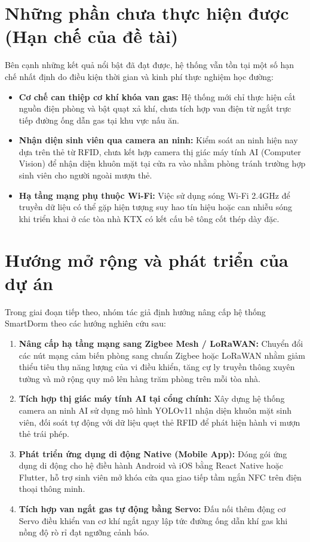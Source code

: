 \section{Những phần chưa thực hiện được (Hạn chế của đề tài)}
\label{sec:han_che}

Bên cạnh những kết quả nổi bật đã đạt được, hệ thống vẫn tồn tại một số hạn chế nhất định do điều kiện thời gian và kinh phí thực nghiệm học đường:
\begin{itemize}
    \item \textbf{Cơ chế can thiệp cơ khí khóa van gas:} Hệ thống mới chỉ thực hiện cắt nguồn điện phòng và bật quạt xả khí, chưa tích hợp van điện từ ngắt trực tiếp đường ống dẫn gas tại khu vực nấu ăn.
    \item \textbf{Nhận diện sinh viên qua camera an ninh:} Kiểm soát an ninh hiện nay dựa trên thẻ từ RFID, chưa kết hợp camera thị giác máy tính AI (Computer Vision) để nhận diện khuôn mặt tại cửa ra vào nhằm phòng tránh trường hợp sinh viên cho người ngoài mượn thẻ.
    \item \textbf{Hạ tầng mạng phụ thuộc Wi-Fi:} Việc sử dụng sóng Wi-Fi 2.4GHz để truyền dữ liệu có thể gặp hiện tượng suy hao tín hiệu hoặc can nhiễu sóng khi triển khai ở các tòa nhà KTX có kết cấu bê tông cốt thép dày đặc.
\end{itemize}

\section{Hướng mở rộng và phát triển của dự án}
\label{sec:huong_phat_trien}

Trong giai đoạn tiếp theo, nhóm tác giả định hướng nâng cấp hệ thống SmartDorm theo các hướng nghiên cứu sau:
\begin{enumerate}
    \item \textbf{Nâng cấp hạ tầng mạng sang Zigbee Mesh / LoRaWAN:} Chuyển đổi các nút mạng cảm biến phòng sang chuẩn Zigbee hoặc LoRaWAN nhằm giảm thiểu tiêu thụ năng lượng của vi điều khiển, tăng cự ly truyền thông xuyên tường và mở rộng quy mô lên hàng trăm phòng trên mỗi tòa nhà.
    \item \textbf{Tích hợp thị giác máy tính AI tại cổng chính:} Xây dựng hệ thống camera an ninh AI sử dụng mô hình YOLOv11 nhận diện khuôn mặt sinh viên, đối soát tự động với dữ liệu quẹt thẻ RFID để phát hiện hành vi mượn thẻ trái phép.
    \item \textbf{Phát triển ứng dụng di động Native (Mobile App):} Đóng gói ứng dụng di động cho hệ điều hành Android và iOS bằng React Native hoặc Flutter, hỗ trợ sinh viên mở khóa cửa qua giao tiếp tầm ngắn NFC trên điện thoại thông minh.
    \item \textbf{Tích hợp van ngắt gas tự động bằng Servo:} Đấu nối thêm động cơ Servo điều khiển van cơ khí ngắt ngay lập tức đường ống dẫn khí gas khi nồng độ rò rỉ đạt ngưỡng cảnh báo.
\end{enumerate}

